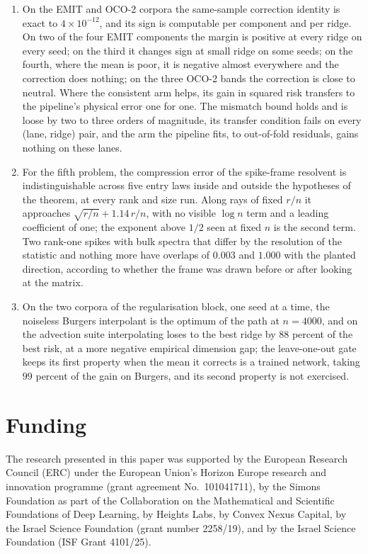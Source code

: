 \documentclass[11pt]{article}
\theoremstyle{definition}
\newcommand{\numGateCaptured}{99}
\newcommand{\numIdentWorst}{4\times10^{-12}}
\newcommand{\numRayC}{1.14}
\begin{document}
\begin{enumerate}
dependence on the augmentation strength, no dependence on the column normalization, and nothing that
one doubling of $d$ can say about the limit; the residual coefficients that argument needs have a
one-line Hermite identification with nonnegativity built in (Proposition~\ref{prop:hermite}).
\item On the EMIT and OCO-2 corpora the same-sample correction identity is exact to
$\numIdentWorst$, and its sign is computable per component and per ridge. On two of the four EMIT
components the margin is positive at every ridge on every seed; on the third it changes sign at
small ridge on some seeds; on the fourth, where the mean is poor, it is negative almost everywhere
and the correction does nothing; on the three OCO-2 bands the correction is close to neutral. Where
the consistent arm helps, its gain in squared risk transfers to the pipeline's physical error one for
one. The mismatch bound holds and is loose by two to three orders of magnitude, its transfer
condition fails on every (lane, ridge) pair, and the arm the pipeline fits, to out-of-fold
residuals, gains nothing on these lanes.
\item For the fifth problem, the compression error of the spike-frame resolvent is indistinguishable
across five entry laws inside and outside the hypotheses of the theorem, at every rank and size run.
Along rays of fixed $r/n$ it approaches $\sqrt{r/n}+\numRayC\,r/n$, with no visible $\log n$ term
and a leading coefficient of one; the exponent above $1/2$ seen at fixed $n$ is the second term.
Two rank-one spikes with bulk spectra that differ by the resolution of the statistic and nothing
more have overlaps of $0.003$ and $1.000$ with the planted direction, according to whether the frame
was drawn before or after looking at the matrix.
\item On the two corpora of the regularisation block, one seed at a time, the noiseless Burgers
interpolant is the optimum of the path at $n=4000$, and on the advection suite interpolating loses to
the best ridge by $88$ percent of the best risk, at a more negative empirical dimension gap; the
leave-one-out gate keeps its first property when the mean it corrects is a trained network, taking
$\numGateCaptured$ percent of the gain on Burgers, and its second property is not exercised.
\end{enumerate}

\section*{Funding}
The research presented in this paper was supported by the European Research Council (ERC) under the
European Union's Horizon Europe research and innovation programme (grant agreement No.~101041711), by
the Simons Foundation as part of the Collaboration on the Mathematical and Scientific Foundations of
Deep Learning, by Heights Labs, by Convex Nexus Capital, by the Israel Science Foundation (grant
number 2258/19), and by the Israel Science Foundation (ISF Grant 4101/25).
\end{document}
